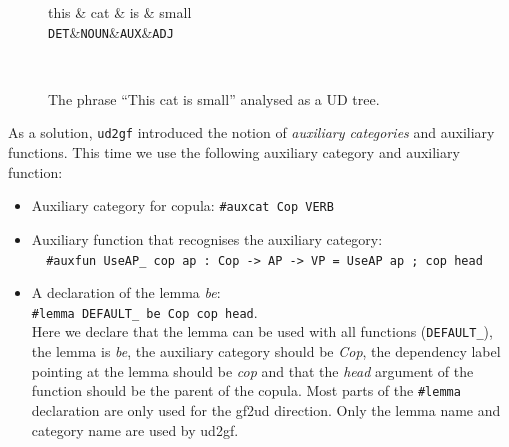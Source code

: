 

\begin{figure}
    \centering
    \begin{dependency}
       \begin{deptext}[column sep=0.4cm]
             this \& cat \& is \& small \\
           {\tt DET}\&{\tt NOUN}\&{\tt AUX}\&{\tt ADJ}\\
       \end{deptext}
    \end{dependency} \\
    \caption{The phrase ``This cat is small'' analysed as a UD tree.}
    \label{fig:ud-this-cat-is-small}
\end{figure}

As a solution, \verb|ud2gf| introduced the notion of \emph{auxiliary categories} and auxiliary functions.
This time we use the following auxiliary category and auxiliary function:
\begin{itemize}
    \item Auxiliary category for copula: \verb|#auxcat Cop VERB|
    \item Auxiliary function that recognises the auxiliary category: \\
          \verb|  #auxfun UseAP_ cop ap : Cop -> AP -> VP = UseAP ap ; cop head|
    \item A declaration of the lemma \emph{be}: \\ \verb|#lemma DEFAULT_ be Cop cop head|. \\
    Here we declare that the lemma can be used with all functions (\verb|DEFAULT_|), the lemma is \emph{be}, the auxiliary category should be \emph{Cop}, the dependency label pointing at the lemma should be \emph{cop} and that the \emph{head} argument of the function should be the parent of the copula. Most parts of the \verb|#lemma| declaration are only used for the gf2ud direction. Only the lemma name and category name are used by ud2gf.
\end{itemize}



